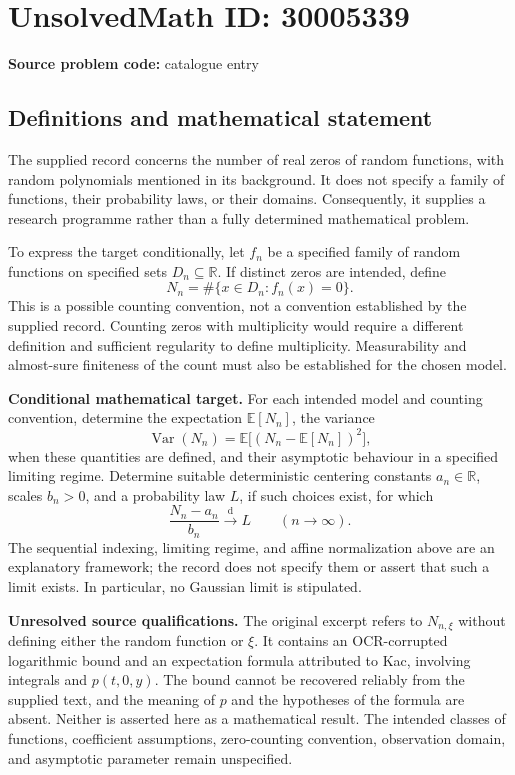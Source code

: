 \documentclass[11pt]{article}
\newcommand{\R}{\mathbb{R}}
\newcommand{\E}{\mathbb{E}}
\begin{document}
\section*{UnsolvedMath ID: 30005339}
\textbf{Source problem code:} catalogue entry
\subsection{Definitions and mathematical statement}
The supplied record concerns the number of real zeros of random functions, with random polynomials mentioned in its background. It does not specify a family of functions, their probability laws, or their domains. Consequently, it supplies a research programme rather than a fully determined mathematical problem.

To express the target conditionally, let \(f_n\) be a specified family of random functions on specified sets \(D_n\subseteq\R\). If distinct zeros are intended, define
\[
N_n=\#\{x\in D_n:f_n(x)=0\}.
\]
This is a possible counting convention, not a convention established by the supplied record. Counting zeros with multiplicity would require a different definition and sufficient regularity to define multiplicity. Measurability and almost-sure finiteness of the count must also be established for the chosen model.

\textbf{Conditional mathematical target.} For each intended model and counting convention, determine the expectation \(\E[N_n]\), the variance
\[
\operatorname{Var}(N_n)=\E\bigl[(N_n-\E[N_n])^2\bigr],
\]
when these quantities are defined, and their asymptotic behaviour in a specified limiting regime. Determine suitable deterministic centering constants \(a_n\in\R\), scales \(b_n>0\), and a probability law \(L\), if such choices exist, for which
\[
\frac{N_n-a_n}{b_n}\xrightarrow{\mathrm d}L
\qquad(n\to\infty).
\]
The sequential indexing, limiting regime, and affine normalization above are an explanatory framework; the record does not specify them or assert that such a limit exists. In particular, no Gaussian limit is stipulated.

\textbf{Unresolved source qualifications.} The original excerpt refers to \(N_{n,\xi}\) without defining either the random function or \(\xi\). It contains an OCR-corrupted logarithmic bound and an expectation formula attributed to Kac, involving integrals and \(p(t,0,y)\). The bound cannot be recovered reliably from the supplied text, and the meaning of \(p\) and the hypotheses of the formula are absent. Neither is asserted here as a mathematical result. The intended classes of functions, coefficient assumptions, zero-counting convention, observation domain, and asymptotic parameter remain unspecified.
\end{document}
